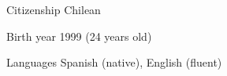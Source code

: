 
\begin{cvskills}

	\cvskill
	{Citizenship}
    {Chilean}

	\cvskill
	{Birth year}
    {1999 (24 years old)}

	\cvskill
	{Languages}
    {Spanish (native), English (fluent)}

\end{cvskills}
